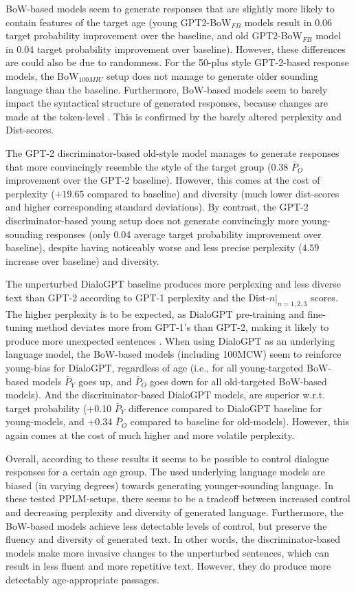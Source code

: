 BoW-based models seem to generate responses that are slightly more likely to contain features of the target age (young GPT2-BoW$_{FB}$ models result in 0.06 target probability improvement over the baseline, and old GPT2-BoW$_{FB}$ model in 0.04 target probability improvement over baseline). However, these differences are could also be due to randomness. For the 50-plus style GPT-2-based response models, the BoW$_{100MIU}$ setup does not manage to generate older sounding language than the baseline. Furthermore, BoW-based models seem to barely impact the syntactical structure of generated responses, because changes are made at the token-level \cite{dathathri2019plug}. This is confirmed by the barely altered perplexity and Dist-scores.  

The GPT-2 discriminator-based old-style model manages to generate responses that more convincingly resemble the style of the target group (0.38 $\bar{P}_O$ improvement over the GPT-2 baseline). However, this comes at the cost of perplexity ($+19.65$ compared to baseline) and diversity (much lower dist-scores and higher corresponding standard deviations). By contrast, the GPT-2 discriminator-based young setup does not generate convincingly more young-sounding responses (only 0.04 average target probability improvement over baseline), despite having noticeably worse and less precise perplexity ($4.59$ increase over baseline) and diversity.

The unperturbed DialoGPT baseline produces more perplexing and less diverse text than GPT-2 according to GPT-1 perplexity and the Dist-$n |_{n = 1,2,3}$ scores. The higher perplexity is to be expected, as DialoGPT pre-training and fine-tuning method deviates more from GPT-1's than GPT-2, making it likely to produce more unexpected sentences \citep{zhang2019dialogpt}. When using DialoGPT as an underlying language model, the BoW-based models (including 100MCW) seem to reinforce young-bias for DialoGPT, regardless of age (i.e., for all young-targeted BoW-based models $\bar{P}_Y$ goes up, and $\bar{P}_O$ goes down for all old-targeted BoW-based models). And the discriminator-based DialoGPT models, are superior w.r.t. target probability (+0.10 $\bar{P}_Y$ difference compared to DialoGPT baseline for young-models, and +0.34 $\bar{P}_O$ compared to baseline for old-models). However, this again comes at the cost of much higher and more volatile perplexity.

Overall, according to these results it seems to be possible to control dialogue responses for a certain age group. The used underlying language models are biased (in varying degrees) towards generating younger-sounding language. In these tested PPLM-setups, there seems to be a tradeoff between increased control and decreasing perplexity and diversity of generated language. Furthermore, the BoW-based models achieve less detectable levels of control, but preserve the fluency and diversity of generated text. In other words, the discriminator-based models make more invasive changes to the unperturbed sentences, which can result in less fluent and more repetitive text. However, they do produce more detectably age-appropriate passages.

